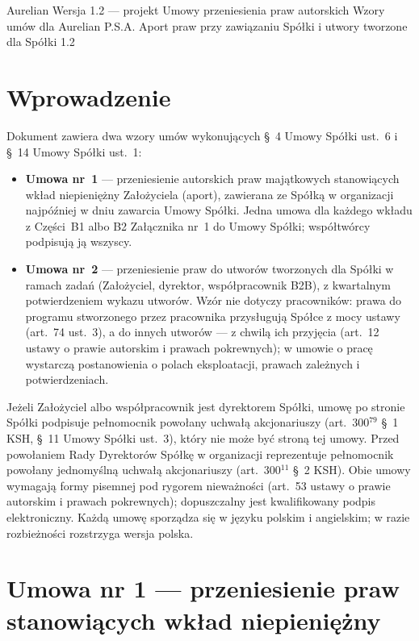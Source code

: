 \documentclass[12pt,a4paper]{report}
\newcounter{paragraf}
\newcommand{\US}[1]{§~#1 Umowy Spółki}
\begin{document}
\BusinessPlanTitlePage
  {Aurelian}
  {Wersja 1.2 --- projekt}
  {Umowy przeniesienia praw autorskich}
  {Wzory umów dla Aurelian P.S.A.}
  {Aport praw przy zawiązaniu Spółki i utwory tworzone dla Spółki}
  {1.2}

\tableofcontents
\newpage

\chapter*{Wprowadzenie}

Dokument zawiera dwa wzory umów wykonujących \US{4} ust.~6 i \US{14} ust.~1:

\begin{itemize}
  \item \textbf{Umowa nr~1} --- przeniesienie autorskich praw majątkowych stanowiących wkład niepieniężny Założyciela (aport), zawierana ze Spółką w organizacji najpóźniej w dniu zawarcia Umowy Spółki. Jedna umowa dla każdego wkładu z Części~B1 albo B2 Załącznika nr~1 do Umowy Spółki; współtwórcy podpisują ją wszyscy.
  \item \textbf{Umowa nr~2} --- przeniesienie praw do utworów tworzonych dla Spółki w ramach zadań (Założyciel, dyrektor, współpracownik B2B), z kwartalnym potwierdzeniem wykazu utworów. Wzór nie dotyczy pracowników: prawa do programu stworzonego przez pracownika przysługują Spółce z mocy ustawy (art.~74 ust.~3), a do innych utworów --- z chwilą ich przyjęcia (art.~12 ustawy o prawie autorskim i prawach pokrewnych); w umowie o pracę wystarczą postanowienia o polach eksploatacji, prawach zależnych i potwierdzeniach.
\end{itemize}

Jeżeli Założyciel albo współpracownik jest dyrektorem Spółki, umowę po stronie Spółki podpisuje pełnomocnik powołany uchwałą akcjonariuszy (art.~300$^{79}$ §~1 KSH, \US{11} ust.~3), który nie może być stroną tej umowy. Przed powołaniem Rady Dyrektorów Spółkę w organizacji reprezentuje pełnomocnik powołany jednomyślną uchwałą akcjonariuszy (art.~300$^{11}$ §~2 KSH). Obie umowy wymagają formy pisemnej pod rygorem nieważności (art.~53 ustawy o prawie autorskim i prawach pokrewnych); dopuszczalny jest kwalifikowany podpis elektroniczny. Każdą umowę sporządza się w języku polskim i angielskim; w razie rozbieżności rozstrzyga wersja polska.

\chapter*{Umowa nr 1 --- przeniesienie praw stanowiących wkład niepieniężny}
\setcounter{paragraf}{0}
\end{document}
